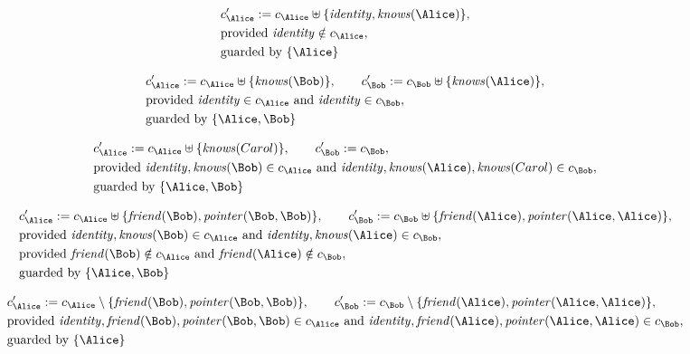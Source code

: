 \begin{align*}
&
c'_
{
\Alice
}
 := 
c_
{
\Alice
}
 \uplus 
\{
\mathit{
identity
}
,
\mathit{
knows
}
(
\Alice
)
\}
,\\
&
\text{provided } 
\mathit{
identity
}
 \notin c_
{
\Alice
}
,\\
&
\text{guarded by } \{
\Alice
\}
\end{align*}

\begin{align*}
&
c'_
{
\Alice
}
 := 
c_
{
\Alice
}
 \uplus 
\{
\mathit{
knows
}
(
\Bob
)
\}
, \qquad 
c'_
{
\Bob
}
 := 
c_
{
\Bob
}
 \uplus 
\{
\mathit{
knows
}
(
\Alice
)
\}
,\\
&
\text{provided } 
\mathit{
identity
}
 \in c_
{
\Alice
}
 \text{ and } 
\mathit{
identity
}
 \in c_
{
\Bob
}
,\\
&
\text{guarded by } \{
\Alice
,
\Bob
\}
\end{align*}

\begin{align*}
&
c'_
{
\Alice
}
 := 
c_
{
\Alice
}
 \uplus 
\{
\mathit{
knows
}
(
Carol
)
\}
, \qquad 
c'_
{
\Bob
}
 := 
c_
{
\Bob
}
,\\
&
\text{provided } 
\mathit{
identity
}
,
\mathit{
knows
}
(
\Bob
)
 \in c_
{
\Alice
}
 \text{ and } 
\mathit{
identity
}
,
\mathit{
knows
}
(
\Alice
)
,
\mathit{
knows
}
(
Carol
)
 \in c_
{
\Bob
}
,\\
&
\text{guarded by } \{
\Alice
,
\Bob
\}
\end{align*}

\begin{align*}
&
c'_
{
\Alice
}
 := 
c_
{
\Alice
}
 \uplus 
\{
\mathit{
friend
}
(
\Bob
)
,
\mathit{
pointer
}
(
\Bob
,
\Bob
)
\}
, \qquad 
c'_
{
\Bob
}
 := 
c_
{
\Bob
}
 \uplus 
\{
\mathit{
friend
}
(
\Alice
)
,
\mathit{
pointer
}
(
\Alice
,
\Alice
)
\}
,\\
&
\text{provided } 
\mathit{
identity
}
,
\mathit{
knows
}
(
\Bob
)
 \in c_
{
\Alice
}
 \text{ and } 
\mathit{
identity
}
,
\mathit{
knows
}
(
\Alice
)
 \in c_
{
\Bob
}
,\\
&
\text{provided } 
\mathit{
friend
}
(
\Bob
)
 \notin c_
{
\Alice
}
 \text{ and } 
\mathit{
friend
}
(
\Alice
)
 \notin c_
{
\Bob
}
,\\
&
\text{guarded by } \{
\Alice
,
\Bob
\}
\end{align*}

\begin{align*}
&
c'_
{
\Alice
}
 := 
c_
{
\Alice
}
 \setminus 
\{
\mathit{
friend
}
(
\Bob
)
,
\mathit{
pointer
}
(
\Bob
,
\Bob
)
\}
, \qquad 
c'_
{
\Bob
}
 := 
c_
{
\Bob
}
 \setminus 
\{
\mathit{
friend
}
(
\Alice
)
,
\mathit{
pointer
}
(
\Alice
,
\Alice
)
\}
,\\
&
\text{provided } 
\mathit{
identity
}
,
\mathit{
friend
}
(
\Bob
)
,
\mathit{
pointer
}
(
\Bob
,
\Bob
)
 \in c_
{
\Alice
}
 \text{ and } 
\mathit{
identity
}
,
\mathit{
friend
}
(
\Alice
)
,
\mathit{
pointer
}
(
\Alice
,
\Alice
)
 \in c_
{
\Bob
}
,\\
&
\text{guarded by } \{
\Alice
\}
\end{align*}
